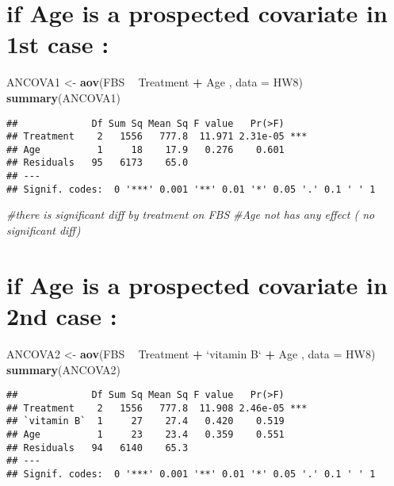 \documentclass[]{article}
\newenvironment{Shaded}{\begin{snugshade}}{\end{snugshade}}
\newcommand{\KeywordTok}[1]{\textcolor[rgb]{0.13,0.29,0.53}{\textbf{#1}}}
\newcommand{\DataTypeTok}[1]{\textcolor[rgb]{0.13,0.29,0.53}{#1}}
\newcommand{\StringTok}[1]{\textcolor[rgb]{0.31,0.60,0.02}{#1}}
\newcommand{\CommentTok}[1]{\textcolor[rgb]{0.56,0.35,0.01}{\textit{#1}}}
\newcommand{\OperatorTok}[1]{\textcolor[rgb]{0.81,0.36,0.00}{\textbf{#1}}}
\newcommand{\NormalTok}[1]{#1}
\begin{document}
\section{if Age is a prospected covariate in 1st case
:}\label{if-age-is-a-prospected-covariate-in-1st-case}

\begin{Shaded}
\begin{Highlighting}[]
\NormalTok{ANCOVA1 <-}\StringTok{ }\KeywordTok{aov}\NormalTok{(FBS }\OperatorTok{~}\StringTok{ }\NormalTok{Treatment }\OperatorTok{+}\StringTok{ }\NormalTok{Age , }\DataTypeTok{data =}\NormalTok{ HW8) }
\KeywordTok{summary}\NormalTok{(ANCOVA1)}
\end{Highlighting}
\end{Shaded}

\begin{verbatim}
##             Df Sum Sq Mean Sq F value   Pr(>F)    
## Treatment    2   1556   777.8  11.971 2.31e-05 ***
## Age          1     18    17.9   0.276    0.601    
## Residuals   95   6173    65.0                     
## ---
## Signif. codes:  0 '***' 0.001 '**' 0.01 '*' 0.05 '.' 0.1 ' ' 1
\end{verbatim}

\begin{Shaded}
\begin{Highlighting}[]
\CommentTok{#there is significant diff by treatment on FBS  }
\CommentTok{#Age  not  has any effect ( no significant diff)}
\end{Highlighting}
\end{Shaded}

\section{if Age is a prospected covariate in 2nd case
:}\label{if-age-is-a-prospected-covariate-in-2nd-case}

\begin{Shaded}
\begin{Highlighting}[]
\NormalTok{ANCOVA2 <-}\StringTok{ }\KeywordTok{aov}\NormalTok{(FBS }\OperatorTok{~}\StringTok{ }\NormalTok{Treatment }\OperatorTok{+}\StringTok{ `}\DataTypeTok{vitamin B}\StringTok{`} \OperatorTok{+}\StringTok{ }\NormalTok{Age , }\DataTypeTok{data =}\NormalTok{ HW8) }
\KeywordTok{summary}\NormalTok{(ANCOVA2)}
\end{Highlighting}
\end{Shaded}

\begin{verbatim}
##             Df Sum Sq Mean Sq F value   Pr(>F)    
## Treatment    2   1556   777.8  11.908 2.46e-05 ***
## `vitamin B`  1     27    27.4   0.420    0.519    
## Age          1     23    23.4   0.359    0.551    
## Residuals   94   6140    65.3                     
## ---
## Signif. codes:  0 '***' 0.001 '**' 0.01 '*' 0.05 '.' 0.1 ' ' 1
\end{verbatim}
\end{document}
